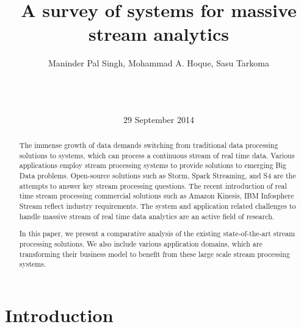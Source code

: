 \documentclass{acm_proc_article-sp}
\begin{document}
 \sloppy

\title{A survey of systems for massive stream analytics}


 \author{
Maninder Pal Singh, Mohammad A. Hoque, Sasu Tarkoma\\  \\
       \\
\\        
}

\date{29 September 2014}


\maketitle
\begin{abstract}
The immense growth of data demands switching from traditional data processing solutions to systems, which can process a continuous stream of real time data. Various applications employ stream processing systems to provide solutions to emerging Big Data problems.  Open-source solutions such as Storm, Spark Streaming, and S4 are the attempts to answer key stream processing questions.  The recent introduction of real time stream processing commercial solutions such as Amazon Kinesis, IBM Infosphere Stream reflect industry requirements.  The system and application related challenges to handle massive stream of real time data analytics are an active field of research.

In this paper, we present a comparative analysis of the existing state-of-the-art stream processing solutions. We also include various application domains, which are transforming their business model to benefit from these large scale stream processing systems. 

\end{abstract}






\section{Introduction}
\end{document}
